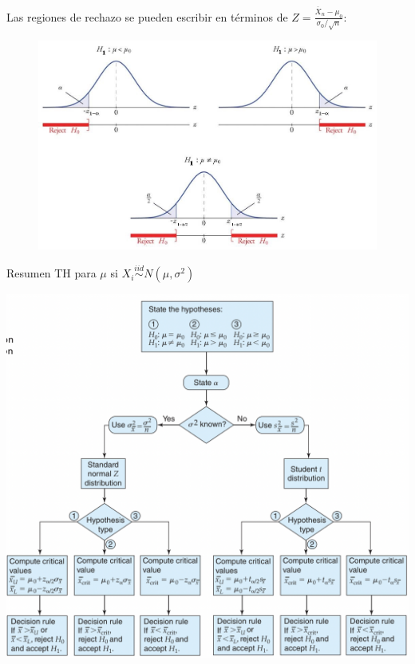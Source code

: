 \documentclass{beamer}
\theoremstyle{definition}
\begin{document}
\begin{frame}
\smallskip
Las regiones de rechazo se pueden escribir en términos de $Z = \frac{\overline{X}_n- \mu_0}{\sigma_0/\sqrt{n}}$:
	\begin{figure}
		\centering
		\includegraphics[width=0.75\linewidth]{img/regionmedia.jpg}\\
	\end{figure}
\begin{center}
\end{center}
\end{frame}

\begin{frame}{\color{rosee}Resumen TH para $\mu$ si $X_i\stackrel{iid}{\sim} N(\mu,\sigma^2)$}
    \begin{center}
        \includegraphics[scale=0.4]{slides6/img/testnormal.png}
    \end{center}
\end{frame}
\end{document}

